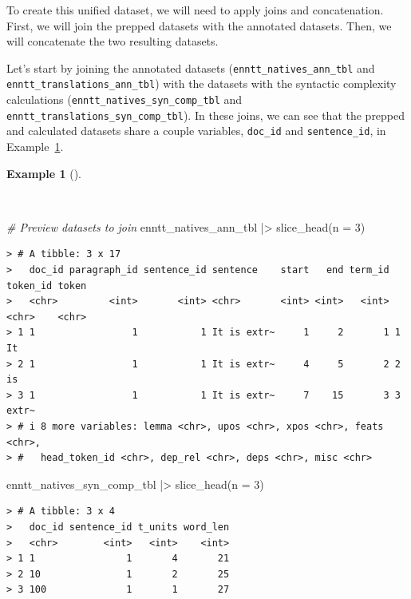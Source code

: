 \documentclass[
  letterpaper,
]{latex/krantz}
\newenvironment{Shaded}{\begin{snugshade}}{\end{snugshade}}
\newcommand{\AttributeTok}[1]{\textcolor[rgb]{0.00,0.00,0.00}{#1}}
\newcommand{\CommentTok}[1]{\textcolor[rgb]{0.00,0.00,0.00}{\textit{#1}}}
\newcommand{\DecValTok}[1]{\textcolor[rgb]{0.00,0.00,0.00}{#1}}
\newcommand{\FunctionTok}[1]{\textcolor[rgb]{0.00,0.00,0.00}{#1}}
\newcommand{\NormalTok}[1]{\textcolor[rgb]{0.00,0.00,0.00}{#1}}
\newcommand{\SpecialCharTok}[1]{\textcolor[rgb]{0.00,0.00,0.00}{#1}}
\theoremstyle{definition}
\newtheorem{example}{Example}[chapter]
\theoremstyle{remark}
\begin{document}
To create this unified dataset, we will need to apply joins and
concatenation. First, we will join the prepped datasets with the
annotated datasets. Then, we will concatenate the two resulting
datasets.

Let's start by joining the annotated datasets
(\texttt{enntt\_natives\_ann\_tbl} and
\texttt{enntt\_translations\_ann\_tbl}) with the datasets with the
syntactic complexity calculations
(\texttt{enntt\_natives\_syn\_comp\_tbl} and
\texttt{enntt\_translations\_syn\_comp\_tbl}). In these joins, we can
see that the prepped and calculated datasets share a couple variables,
\texttt{doc\_id} and \texttt{sentence\_id}, in
Example~\ref{exm-td-merging-join-prepped-syn-comp}.

\begin{example}[]\protect\hypertarget{exm-td-merging-join-prepped-syn-comp}{}\label{exm-td-merging-join-prepped-syn-comp}

~

\begin{Shaded}
\begin{Highlighting}[]
\CommentTok{\# Preview datasets to join}
\NormalTok{enntt\_natives\_ann\_tbl }\SpecialCharTok{|\textgreater{}}
  \FunctionTok{slice\_head}\NormalTok{(}\AttributeTok{n =} \DecValTok{3}\NormalTok{)}
\end{Highlighting}
\end{Shaded}

\begin{verbatim}
> # A tibble: 3 x 17
>   doc_id paragraph_id sentence_id sentence    start   end term_id token_id token
>   <chr>         <int>       <int> <chr>       <int> <int>   <int> <chr>    <chr>
> 1 1                 1           1 It is extr~     1     2       1 1        It   
> 2 1                 1           1 It is extr~     4     5       2 2        is   
> 3 1                 1           1 It is extr~     7    15       3 3        extr~
> # i 8 more variables: lemma <chr>, upos <chr>, xpos <chr>, feats <chr>,
> #   head_token_id <chr>, dep_rel <chr>, deps <chr>, misc <chr>
\end{verbatim}

\begin{Shaded}
\begin{Highlighting}[]
\NormalTok{enntt\_natives\_syn\_comp\_tbl }\SpecialCharTok{|\textgreater{}}
  \FunctionTok{slice\_head}\NormalTok{(}\AttributeTok{n =} \DecValTok{3}\NormalTok{)}
\end{Highlighting}
\end{Shaded}

\begin{verbatim}
> # A tibble: 3 x 4
>   doc_id sentence_id t_units word_len
>   <chr>        <int>   <int>    <int>
> 1 1                1       4       21
> 2 10               1       2       25
> 3 100              1       1       27
\end{verbatim}

\end{example}
\end{document}
